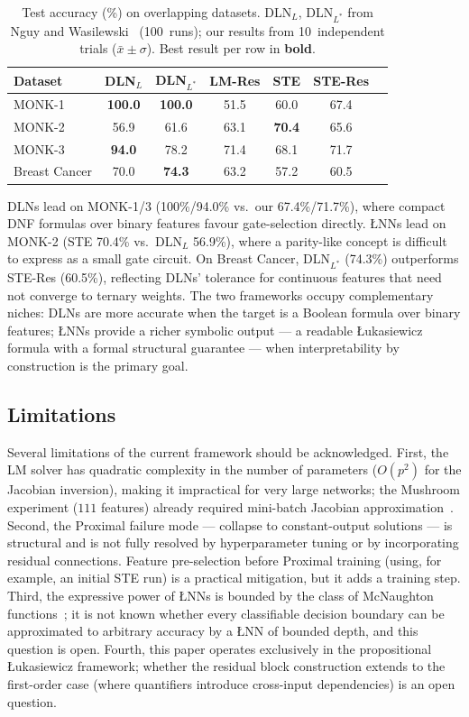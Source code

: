 \documentclass[lettersize,journal]{IEEEtran}
\newcommand{\LNN}{\L{}NN}
\begin{document}
\begin{table}[ht]
\centering
\caption{Test accuracy (\%) on overlapping datasets.
DLN$_L$, DLN$_{L^*}$ from Nguy and Wasilewski~\cite{nguy2025} (100~runs);
our results from 10~independent trials ($\bar{x}\pm\sigma$).
Best result per row in \textbf{bold}.}
\label{tab:vs_dln}
\setlength{\tabcolsep}{4pt}
\begin{tabular}{lcccccc}
\toprule
Dataset & DLN$_L$ & DLN$_{L^*}$ & LM-Res & STE & STE-Res \\
\midrule
MONK-1       & \textbf{100.0} & \textbf{100.0} & 51.5 & 60.0 & 67.4 \\
MONK-2       & 56.9           & 61.6           & 63.1 & \textbf{70.4} & 65.6 \\
MONK-3       & \textbf{94.0} & 78.2           & 71.4 & 68.1 & 71.7 \\
Breast Cancer & 70.0          & \textbf{74.3}  & 63.2 & 57.2 & 60.5 \\
\bottomrule
\end{tabular}
\end{table}

DLNs lead on MONK-1/3 (100\%/94.0\% vs.\ our 67.4\%/71.7\%), where compact
DNF formulas over binary features favour gate-selection directly.
\LNN{}s lead on MONK-2 (STE 70.4\% vs.\ DLN$_L$ 56.9\%), where a parity-like
concept is difficult to express as a small gate circuit.
On Breast Cancer, DLN$_{L^*}$ (74.3\%) outperforms STE-Res (60.5\%),
reflecting DLNs' tolerance for continuous features that need not converge to
ternary weights.
The two frameworks occupy complementary niches: DLNs are more accurate when
the target is a Boolean formula over binary features; \LNN{}s provide a richer
symbolic output --- a readable \L{}ukasiewicz formula with a formal structural
guarantee --- when interpretability by construction is the primary goal.

\subsection{Limitations}

Several limitations of the current framework should be acknowledged.
First, the LM solver has quadratic complexity in the number of parameters
($O(p^2)$ for the Jacobian inversion), making it impractical for very large
networks; the Mushroom experiment ($111$ features) already required mini-batch
Jacobian approximation~\cite{battiti1992}.
Second, the Proximal failure mode --- collapse to constant-output solutions ---
is structural and is not fully resolved by hyperparameter tuning or by
incorporating residual connections.
Feature pre-selection before Proximal training (using, for example, an initial
STE run) is a practical mitigation, but it adds a training step.
Third, the expressive power of \LNN{}s is bounded by the class of McNaughton
functions~\cite{mcnaughton1951,hajek1998}; it is not known whether every
classifiable decision boundary can be approximated to arbitrary accuracy by a
\LNN{} of bounded depth, and this question is open.
Fourth, this paper operates exclusively in the propositional \L{}ukasiewicz
framework; whether the residual block construction extends to the first-order
case (where quantifiers introduce cross-input dependencies) is an open question.
\end{document}
